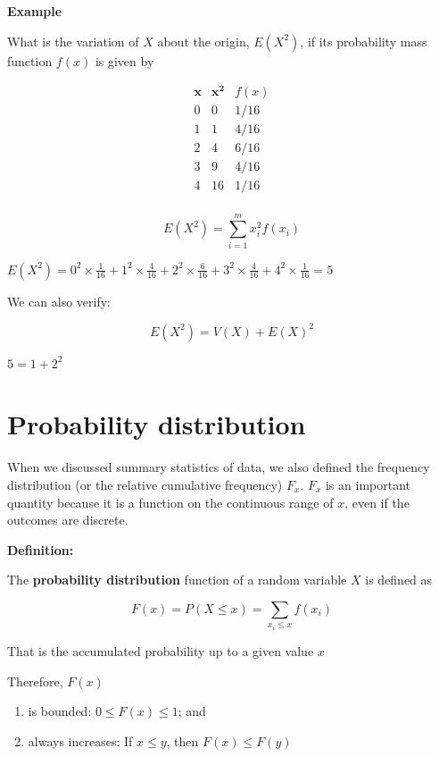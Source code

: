 \documentclass[
]{book}
\providecommand{\tightlist}{%
  \setlength{\itemsep}{0pt}\setlength{\parskip}{0pt}}
\begin{document}
\textbf{Example}

What is the variation of \(X\) about the origin, \(E(X^2)\), if its probability mass function \(f(x)\) is given by

\[
\begin{array}{ccc}
\mathbf{x} &\mathbf{x^2} & f(x) \\
0 & 0 &1/16 \\
1 & 1 &4/16 \\
2 & 4 &6/16 \\
3 & 9 &4/16 \\
4 & 16 &1/16 \\
\end{array}
\]

\[E(X^2) =\sum_{i=1}^m x_i^2 f(x_i)\]

\(E(X^2)=0^2 \times \frac{1}{16} + 1^2 \times \frac{4}{16} + 2^2 \times \frac{6}{16} + 3^2 \times \frac{4}{16} + 4^2 \times \frac{1}{16} =5\)

We can also verify:

\[E(X^2)=V(X)+E(X)^2\]

\(5=1+2^2\)

\hypertarget{probability-distribution}{%
\section{Probability distribution}\label{probability-distribution}}

When we discussed summary statistics of data, we also defined the frequency distribution (or the relative cumulative frequency) \(F_x\). \(F_x\) is an important quantity because it is a function on the continuous range of \(x\), even if the outcomes are discrete.

\textbf{Definition:}

The \textbf{probability distribution} function of a random variable \(X\) is defined as

\[F(x)=P(X\leq x)=\sum_{x_i\leq x} f(x_i) \]

That is the accumulated probability up to a given value \(x\)

Therefore, \(F(x)\)

\begin{enumerate}
\def\labelenumi{\arabic{enumi})}
\tightlist
\item
  is bounded: \(0\leq F(x) \leq 1\); and
\item
  always increases: If \(x \leq y\), then \(F(x) \leq F(y)\)
\end{enumerate}
\end{document}
